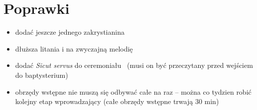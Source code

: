 \color{red}

\section{Poprawki}
\begin{itemize}
      \item dodać jeszcze jednego zakrystianina
      \item dłuższa litania i na zwyczajną melodię
      \item dodać \textit{Sicut servus} do ceremoniału \ii~(musi on być
            przeczytany przed wejściem do baptysterium)
      \item obrzędy wstępne nie muszą się odbywać całe na raz -- można co
            tydzien robić kolejny etap wprowadzający (całe obrzędy wstępne
            trwają 30 min)
\end{itemize}